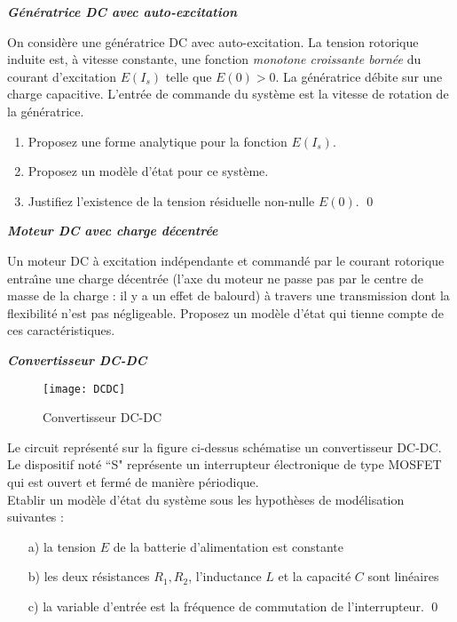 \begin{exercice}{\bf \em Génératrice DC avec auto-excitation}

On considère une génératrice DC avec auto-excitation. La tension
rotorique induite est, à vitesse constante, une fonction {\em monotone
croissante bornée} du courant d'excitation $E(I_s)$ telle que $E(0) >
0$. La génératrice débite sur une charge capacitive. L'entrée de
commande du système est la vitesse de rotation de la
génératrice.
\begin{enumerate}
\item Proposez une forme analytique pour la fonction $E(I_s)$.
\item Proposez un modèle d'état pour ce système.
\item Justifiez l'existence de la tension résiduelle non-nulle $E(0)$. \qed
\end{enumerate}
\end{exercice}
\vv

\begin{exercice}{\bf \em Moteur DC avec charge décentrée}

 Un moteur DC à excitation indépendante et commandé par le
courant rotorique entra{\^\i}ne une charge décentrée (l'axe du moteur
ne passe pas par le centre de masse de la charge : il y a un effet de
balourd) à travers une transmission dont la flexibilité n'est pas
négligeable. Proposez un modèle d'état qui tienne compte de ces
caractéristiques.
\end{exercice}
\vv

\begin{exercice}{\bf \em Convertisseur DC-DC}

\begin{figure}[htbp]
\begin{center}
\texttt{[image: DCDC]}
\caption{Convertisseur DC-DC}
\label{fig:DCDC}
\end{center}
\end{figure}
Le circuit représenté sur la figure ci-dessus schématise un convertisseur
DC-DC.  Le dispositif noté ``S" représente un interrupteur
électronique de type MOSFET qui est ouvert et fermé de manière périodique.\\

Etablir un modèle d'état du système sous les hypothèses de modélisation
suivantes :
\begin{itemize}
\item[a)] la tension $E$ de la batterie d'alimentation est constante
\item[b)] les deux résistances $R_1, R_2$, l'inductance $L$ et la capacité
$C$ sont linéaires
\item[c)] la variable d'entrée est la fréquence de commutation de
l'interrupteur. \qed
\end{itemize} 
\end{exercice}




